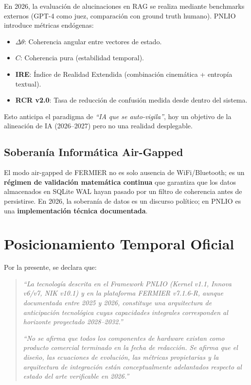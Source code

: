 \documentclass[12pt,a4paper]{article}
\begin{document}
En 2026, la evaluación de alucinaciones en RAG se realiza mediante benchmarks externos (GPT-4 como juez, comparación con ground truth humano). PNLIO introduce métricas endógenas:

\begin{itemize}[leftmargin=2cm]
    \item \textbf{$\Delta\theta$}: Coherencia angular entre vectores de estado.
    \item \textbf{$C$}: Coherencia pura (estabilidad temporal).
    \item \textbf{IRE}: Índice de Realidad Extendida (combinación cinemática + entropía textual).
    \item \textbf{RCR v2.0}: Tasa de reducción de confusión medida desde dentro del sistema.
\end{itemize}

Esto anticipa el paradigma de \textit{``IA que se auto-vigila''}, hoy un objetivo de la alineación de IA (2026--2027) pero no una realidad desplegable.

\subsection{Soberanía Informática Air-Gapped}

El modo air-gapped de FERMIER no es solo ausencia de WiFi/Bluetooth; es un \textbf{régimen de validación matemática continua} que garantiza que los datos almacenados en SQLite WAL hayan pasado por un filtro de coherencia antes de persistirse. En 2026, la soberanía de datos es un discurso político; en PNLIO es una \textbf{implementación técnica documentada}.

\section{Posicionamiento Temporal Oficial}

Por la presente, se declara que:

\begin{quote}
\textit{``La tecnología descrita en el Framework PNLIO (Kernel v1.1, Innova v6/v7, NIK v10.1) y en la plataforma FERMIER v7.1.6-R, aunque documentada entre 2025 y 2026, constituye una arquitectura de anticipación tecnológica cuyas capacidades integrales corresponden al horizonte proyectado 2028--2032.''}

\textit{``No se afirma que todos los componentes de hardware existan como producto comercial terminado en la fecha de redacción. Se afirma que el diseño, las ecuaciones de evolución, las métricas propietarias y la arquitectura de integración están conceptualmente adelantados respecto al estado del arte verificable en 2026.''}
\end{quote}
\end{document}
